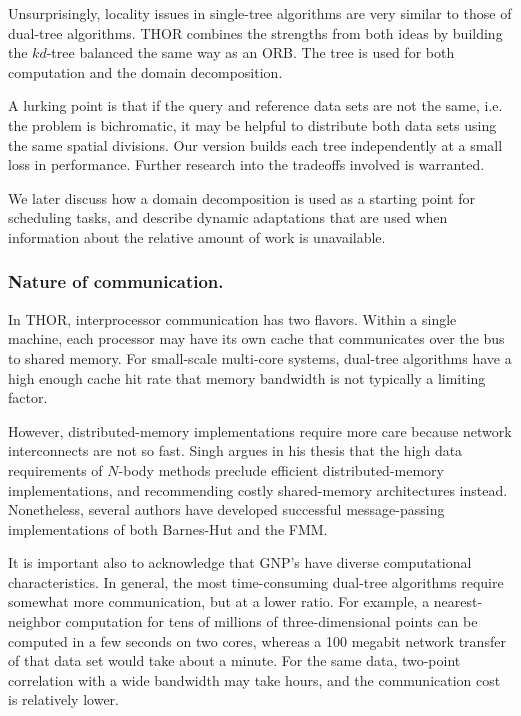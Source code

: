 \documentclass[twoside,leqno,twocolumn]{article}
\newcommand{\mysubsub}[1]{\subsubsection{#1.}}
\begin{document}
Unsurprisingly, locality issues in single-tree algorithms are very similar to those of dual-tree algorithms.
THOR combines the strengths from both ideas by building the $kd$-tree balanced the same way as an ORB.
The tree is used for both computation and the domain decomposition.

A lurking point is that if the query and reference data sets are not the same, i.e. the problem is bichromatic, it may be helpful to distribute both data sets using the same spatial divisions.
Our version builds each tree independently at a small loss in performance.
Further research into the tradeoffs involved is warranted.

We later discuss how a domain decomposition is used as a starting point for scheduling tasks, and describe dynamic adaptations that are used when information about the relative amount of work is unavailable.

\mysubsub{Nature of communication}

In THOR, interprocessor communication has two flavors.
Within a single machine, each processor may have its own cache that communicates over the bus to shared memory.
For small-scale multi-core systems, dual-tree algorithms have a high enough cache hit rate that memory bandwidth is not typically a limiting factor.

However, distributed-memory implementations require more care because network interconnects are not so fast.
Singh argues in his thesis \cite{singh_thesis} that the high data requirements of $N$-body methods preclude efficient distributed-memory implementations, and recommending costly shared-memory architectures instead.
Nonetheless, several authors \cite{salmon_thesis, liu94experiences, salmon97parallel} have developed successful message-passing implementations of both Barnes-Hut and the FMM.

It is important also to acknowledge that GNP's have diverse computational characteristics.
In general, the most time-consuming dual-tree algorithms require somewhat more communication, but at a lower ratio.
For example, a nearest-neighbor computation for tens of millions of three-dimensional points can be computed in a few seconds on two cores, whereas a 100 megabit network transfer of that data set would take about a minute.
For the same data, two-point correlation with a wide bandwidth may take hours, and the communication cost is relatively lower.
\end{document}

